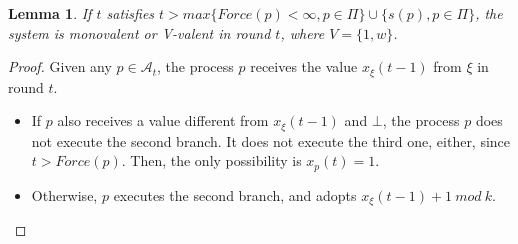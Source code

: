 \documentclass{article}
\newtheorem{lemma}{Lemma}[section]
\begin{document}
\begin{lemma}\label{lem:mono_bi}
	If $t$ satisfies $t > max \{Force(p) < \infty, p \in \Pi\} \cup \{s(p), p \in \Pi\}$,
	the system is monovalent or V-valent in round $t$, where $V = \{1, w\}$.
\end{lemma}
\begin{proof}
	Given any $p \in \mathcal{A}_t$, the process $p$ receives the value $x_\xi(t-1)$ from $\xi$ in round $t$.
	\begin{itemize}
		\item If $p$ also receives a value different from $x_\xi(t-1)$ and $\bot$, the process $p$ does not 
			execute the second branch. It does not execute the third one, either, since $t > Force(p)$.
			Then, the only possibility is $x_p(t) = 1$.
		\item Otherwise, $p$ executes the second branch, and adopts $x_\xi(t-1)+1~mod~k$.
	\end{itemize}
\end{proof}
\end{document}
